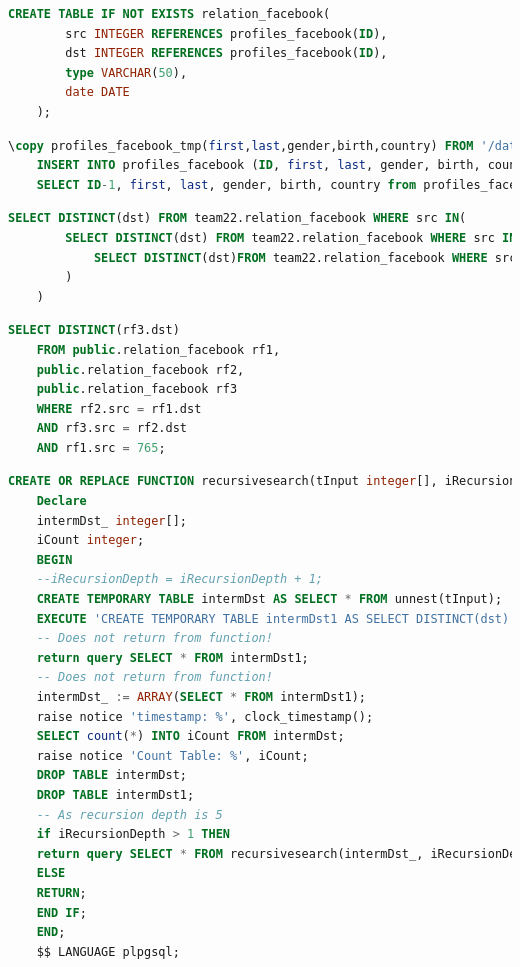 \begin{lstlisting}[language=SQL,caption=Anlegen der Tabelle facebook-relation,frame=single, label={relationFacebook}]
    CREATE TABLE IF NOT EXISTS relation_facebook(
        src INTEGER REFERENCES profiles_facebook(ID),
        dst INTEGER REFERENCES profiles_facebook(ID),
        type VARCHAR(50),
        date DATE
    );
\end{lstlisting}

\begin{lstlisting}[language=SQL,caption=Hinzufügen von Fremdschlüsseln,frame=single, label={foreignKey}]
    \copy profiles_facebook_tmp(first,last,gender,birth,country) FROM '/data/WS2018/facebook-profiles' DELIMITER ',' CSV HEADER;
    INSERT INTO profiles_facebook (ID, first, last, gender, birth, country)
    SELECT ID-1, first, last, gender, birth, country from profiles_facebook_tmp;
\end{lstlisting}

\begin{lstlisting}[language=SQL,caption = Verschachteltes SELECT Statement,frame=single,label={SELECT} ]
    SELECT DISTINCT(dst) FROM team22.relation_facebook WHERE src IN(
        SELECT DISTINCT(dst) FROM team22.relation_facebook WHERE src IN(
            SELECT DISTINCT(dst)FROM team22.relation_facebook WHERE src IN(1)
        )
    )
\end{lstlisting}

\begin{lstlisting}[language=SQL,caption = Rekursiver JOIN,frame=single, label={JOIN} ]
    SELECT DISTINCT(rf3.dst)
    FROM public.relation_facebook rf1,
    public.relation_facebook rf2,
    public.relation_facebook rf3
    WHERE rf2.src = rf1.dst
    AND rf3.src = rf2.dst
    AND rf1.src = 765;
\end{lstlisting}
\newpage
\begin{lstlisting}[language=SQL,caption = Selbstgeschriebenes Stored Procedure,frame=single, label={recursiveFunction} ]
    CREATE OR REPLACE FUNCTION recursivesearch(tInput integer[], iRecursionDepth integer, sTable text) RETURNS SETOF integer AS $$
    Declare
    intermDst_ integer[];
    iCount integer;
    BEGIN
    --iRecursionDepth = iRecursionDepth + 1;
    CREATE TEMPORARY TABLE intermDst AS SELECT * FROM unnest(tInput);
    EXECUTE 'CREATE TEMPORARY TABLE intermDst1 AS SELECT DISTINCT(dst) FROM ' || sTable || ' WHERE src IN (SELECT * FROM intermDst)';
    -- Does not return from function!
    return query SELECT * FROM intermDst1;
    -- Does not return from function!
    intermDst_ := ARRAY(SELECT * FROM intermDst1);
    raise notice 'timestamp: %', clock_timestamp();
    SELECT count(*) INTO iCount FROM intermDst;
    raise notice 'Count Table: %', iCount;
    DROP TABLE intermDst;
    DROP TABLE intermDst1;
    -- As recursion depth is 5
    if iRecursionDepth > 1 THEN
    return query SELECT * FROM recursivesearch(intermDst_, iRecursionDepth - 1, sTable);
    ELSE
    RETURN;
    END IF;
    END;
    $$ LANGUAGE plpgsql;
\end{lstlisting}

